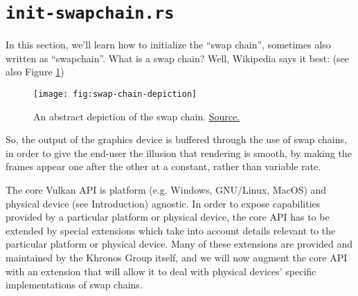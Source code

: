 \documentclass[12pt,letterpaper]{article}
\newcommand{\inquotes}[1]{``#1''}	%
\begin{document}
\section{\texttt{init-swapchain.rs}}
	In this section, we'll learn how to initialize the \inquotes{swap chain}, sometimes also written as \inquotes{swapchain}. What is a swap chain? Well, Wikipedia says it best\autocite{wiki:swap-chain}:
		(see also Figure \ref{fig:swap-chain-depiction})
			\begin{figure}
				\centering
				\texttt{[image: fig:swap-chain-depiction]}
				\caption{An abstract depiction of the swap chain. \href{https://en.wikipedia.org/wiki/File:Swap_chain_depiction.svg}{Source.}}
				\label{fig:swap-chain-depiction}
			\end{figure}

	So, the output of the graphics device is buffered through the use of swap chains, in order to give the end-user the illusion that rendering is smooth, by making the frames appear one after the other at a constant, rather than variable rate.
	
	The core Vulkan API is platform (e.g. Windows, GNU/Linux, MacOS) and physical device (see Introduction) agnostic. In order to expose capabilities provided by a particular platform or physical device, the core API has to be extended by special extensions which take into account details relevant to the particular platform or physical device. Many of these extensions are provided and maintained by the Khronos Group itself, and we will now augment the core API with an extension that will allow it to deal with physical devices' specific implementations of swap chains.  
	
	
\end{document}

